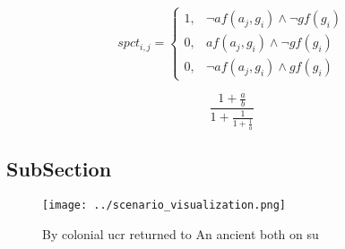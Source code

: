 \documentclass[a4paper]{article}
\begin{document}
\begin{equation}
spct_{i,j} =
\begin{cases}
1, & \text{$\neg af(a_j,g_i) \wedge \neg gf(g_i)$}\\
0, & \text{$af(a_j,g_i) \wedge \neg gf(g_i)$}\\
0, & \text{$\neg af(a_j,g_i) \wedge gf(g_i)$}
\end{cases}
\end{equation}

\[ \frac{1+\frac{a}{b}}{1+\frac{1}{1+\frac{1}{a}}} \]

\subsection{SubSection}

\begin{figure}
\centering
\texttt{[image: ../scenario\_visualization.png]}
\caption{By colonial ucr returned to An ancient both on su
}
\end{figure}
 
\end{document}
